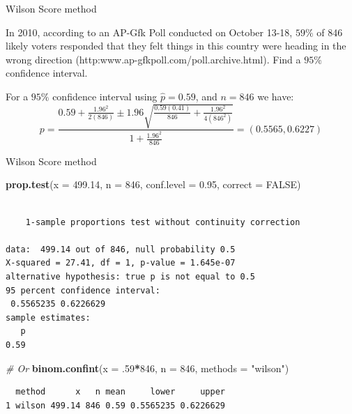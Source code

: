\documentclass[
  ignorenonframetext,
]{beamer}
\newenvironment{Shaded}{\begin{snugshade}}{\end{snugshade}}
\newcommand{\AttributeTok}[1]{\textcolor[rgb]{0.13,0.29,0.53}{#1}}
\newcommand{\CommentTok}[1]{\textcolor[rgb]{0.56,0.35,0.01}{\textit{#1}}}
\newcommand{\ConstantTok}[1]{\textcolor[rgb]{0.56,0.35,0.01}{#1}}
\newcommand{\DecValTok}[1]{\textcolor[rgb]{0.00,0.00,0.81}{#1}}
\newcommand{\FloatTok}[1]{\textcolor[rgb]{0.00,0.00,0.81}{#1}}
\newcommand{\FunctionTok}[1]{\textcolor[rgb]{0.13,0.29,0.53}{\textbf{#1}}}
\newcommand{\NormalTok}[1]{#1}
\newcommand{\SpecialCharTok}[1]{\textcolor[rgb]{0.81,0.36,0.00}{\textbf{#1}}}
\newcommand{\StringTok}[1]{\textcolor[rgb]{0.31,0.60,0.02}{#1}}
\begin{document}
\begin{frame}{Wilson Score method}
\protect\hypertarget{wilson-score-method-1}{}
\begin{tcolorbox}
In 2010, according to an AP-Gfk Poll conducted on October 13-18, $59\%$ of 846 likely voters responded that they felt things in this country were heading in the wrong direction (http:www.ap-gfkpoll.com/poll.archive.html). Find a $95\%$ confidence interval. 
\end{tcolorbox}

\begin{tcolorbox}
For a $95\%$ confidence interval using $\hat{p}=0.59$, and $n=846$ we have:
$$p=\frac{0.59+\frac{1.96^2}{2(846)}\pm 1.96\sqrt{\frac{0.59(0.41)}{846}+\frac{1.96^2}{4(846^2)}}}{1+\frac{1.96^2}{846}}=(0.5565,0.6227)$$
\end{tcolorbox}
\end{frame}

\begin{frame}[fragile]{Wilson Score method}
\protect\hypertarget{wilson-score-method-2}{}
\tiny

\begin{Shaded}
\begin{Highlighting}[]
\FunctionTok{prop.test}\NormalTok{(}\AttributeTok{x =} \FloatTok{499.14}\NormalTok{, }\AttributeTok{n =} \DecValTok{846}\NormalTok{, }\AttributeTok{conf.level =} \FloatTok{0.95}\NormalTok{, }\AttributeTok{correct =} \ConstantTok{FALSE}\NormalTok{)}
\end{Highlighting}
\end{Shaded}

\begin{verbatim}

    1-sample proportions test without continuity correction

data:  499.14 out of 846, null probability 0.5
X-squared = 27.41, df = 1, p-value = 1.645e-07
alternative hypothesis: true p is not equal to 0.5
95 percent confidence interval:
 0.5565235 0.6226629
sample estimates:
   p 
0.59 
\end{verbatim}

\begin{Shaded}
\begin{Highlighting}[]
\CommentTok{\# Or}
\FunctionTok{binom.confint}\NormalTok{(}\AttributeTok{x =}\NormalTok{ .}\DecValTok{59}\SpecialCharTok{*}\DecValTok{846}\NormalTok{, }\AttributeTok{n =} \DecValTok{846}\NormalTok{, }\AttributeTok{methods =} \StringTok{"wilson"}\NormalTok{)}
\end{Highlighting}
\end{Shaded}

\begin{verbatim}
  method      x   n mean     lower     upper
1 wilson 499.14 846 0.59 0.5565235 0.6226629
\end{verbatim}

\normalsize
\end{frame}
\end{document}
